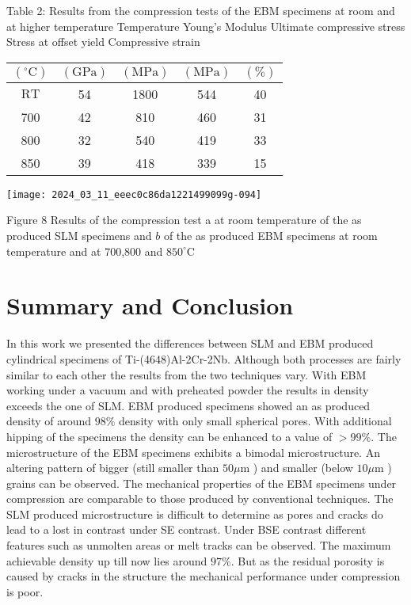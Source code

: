 \documentclass[10pt]{article}
\begin{document}
Table 2: Results from the compression tests of the EBM specimens at room and at higher temperature Temperature Young's Modulus Ultimate compressive stress Stress at offset yield Compressive strain

\begin{center}
\begin{tabular}{ccccc}
$\left({ }^{\circ} \mathrm{C}\right)$ & $(\mathrm{GPa})$ & $(\mathrm{MPa})$ & $(\mathrm{MPa})$ & $(\%)$ \\
\hline
$\mathrm{RT}$ & 54 & 1800 & 544 & 40 \\
700 & 42 & 810 & 460 & 31 \\
800 & 32 & 540 & 419 & 33 \\
850 & 39 & 418 & 339 & 15 \\
\end{tabular}
\end{center}

\begin{center}
\texttt{[image: 2024\_03\_11\_eeec0c86da1221499099g-094]}
\end{center}

Figure 8 Results of the compression test a at room temperature of the as produced SLM specimens and $b$ of the as produced EBM specimens at room temperature and at 700,800 and $850^{\circ} \mathrm{C}$

\section*{Summary and Conclusion}
In this work we presented the differences between SLM and EBM produced cylindrical specimens of Ti-(4648)Al-2Cr-2Nb. Although both processes are fairly similar to each other the results from the two techniques vary. With EBM working under a vacuum and with preheated powder the results in density exceeds the one of SLM. EBM produced specimens showed an as produced density of around $98 \%$ density with only small spherical pores. With additional hipping of the specimens the density can be enhanced to a value of $>99 \%$. The microstructure of the EBM specimens exhibits a bimodal microstructure. An altering pattern of bigger (still smaller than $50 \mu \mathrm{m}$ ) and smaller (below $10 \mu \mathrm{m}$ ) grains can be observed. The mechanical properties of the EBM specimens under compression are comparable to those produced by conventional techniques. The SLM produced microstructure is difficult to determine as pores and cracks do lead to a lost in contrast under SE contrast. Under BSE contrast different features such as unmolten areas or melt tracks can be observed. The maximum achievable density up till now lies around $97 \%$. But as the residual porosity is caused by cracks in the structure the mechanical performance under compression is poor.
\end{document}
